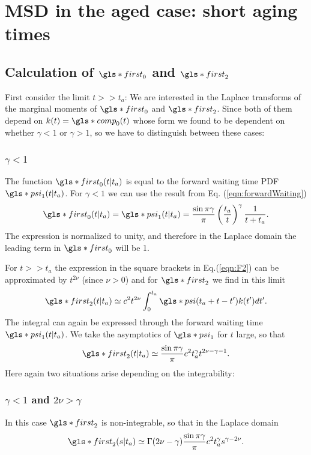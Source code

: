 \section{MSD in the aged case: short aging times}

\subsection*{Calculation of $\gls*{first}_0$ and $\gls*{first}_2$}

First consider the limit $t>>t_a$: We are interested in the Laplace transforms of the marginal moments of $\gls*{first}_0$ and $\gls*{first}_2$. Since both of them depend on $k(t)=\gls*{comp}_0(t)$ 
whose form we found to be dependent on whether $\gamma<1$ or $\gamma>1$, so we have to distinguish between these cases:

\subsubsection{$\gamma<1$}
The function $\gls*{first}_0(t|t_a)$ is equal to the forward waiting time PDF $\gls*{psi}_1(t|t_a)$. For $\gamma<1$ we can use the result from Eq. (\ref{eqn:forwardWaiting})
\begin{equation}
 \gls*{first}_0(t|t_a) = \gls*{psi}_1(t|t_a) = \frac{\sin \pi \gamma}{\pi} \left( \frac{t_a}{t}\right)^\gamma \frac{1}{t+t_a}. \label{eqn:psi1}
\end{equation}
The expression is normalized to unity, and therefore in the Laplace domain the leading term in $\gls*{first}_0$ will be 1. 

For $t>>t_a$ the expression in the square brackets in Eq.(\ref{eqn:F2}) can be approximated by $t^{2\nu}$ (since $\nu > 0$) and for $\gls*{first}_2$ we find in this limit
\begin{equation}
 \gls*{first}_2(t|t_a) \simeq  c^2 t^{2\nu} \int_0^{t_a} \gls*{psi}(t_a+t-t') k(t') dt'.
\end{equation}
The integral can again be expressed through the forward waiting time $\gls*{psi}_1(t|t_a)$. We take the asymptotics of $\gls*{psi}_1$ for $t$ large, so that 
\begin{equation}
\gls*{first}_2(t|t_a) \simeq \frac{\sin \pi \gamma}{\pi} c^2  t_a^\gamma t^{2\nu-\gamma -1}  .  
\end{equation}
Here again two situations arise depending on the integrability: 

\subsubsection{$\gamma <1$ and  $2 \nu > \gamma$}
In this case $\gls*{first}_2$ is non-integrable, so that in the Laplace domain
\begin{equation}
 \gls*{first}_2(s|t_a) \simeq \Gamma(2\nu-\gamma) \frac{\sin \pi \gamma}{\pi} c^2 t_a^\gamma s^{\gamma - 2\nu}.
\end{equation}

